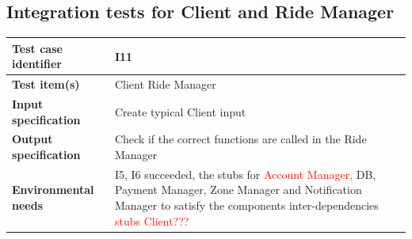\documentclass[a4paper,11pt]{report} %
\begin{document}
		\subsection{Integration tests for Client and Ride Manager}
			\begin{minipage}{\linewidth}
			\end{minipage}		
		\begin{center}
			\renewcommand{\arraystretch}{1.2}
			\setlength{\tabcolsep}{24pt}
			\begin{tabular}{ l  p{9cm}}\hline
				\textbf{Test case identifier} & I11\\\hline
				\textbf{Test item(s)} & Client \textrightarrow Ride Manager\\\hline
				\textbf{Input specification} & Create typical Client input \\\hline
				\textbf{Output specification} & Check if the correct functions are called in the Ride Manager\\\hline
				\textbf{Environmental needs} &  I5, I6 succeeded, the stubs for \textcolor{red}{Account Manager, }DB, Payment Manager, Zone Manager and Notification Manager to satisfy the components inter-dependencies \textcolor{red}{stubs Client???}\\\hline
			\end{tabular}
		\end{center}
		
\end{document}
